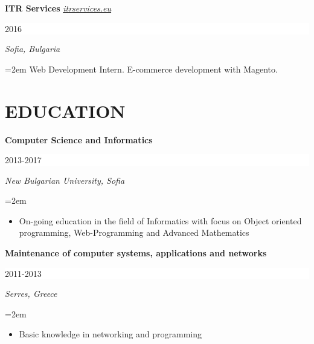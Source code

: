 \documentclass[paper=letter,fontsize=11pt]{scrartcl} %
\newcommand{\sepspace}{\vspace*{1em}}		%
\newcommand{\NewPart}[2]{\section*{\uppercase{#1} \small \normalfont #2}}
\newcommand{\EducationEntry}[4]{
		\noindent \textbf{#1} \hfill      %
		\colorbox{White}{%
			\parbox{6em}{%
			\hfill\color{Black}#2}} \par  %
		\noindent \textit{#3} \par        %
		\noindent\hangindent=2em\hangafter=0 \small #4 %
		\normalsize \par}
\newcommand{\WorkEntry}[5]{
		\noindent \textbf{#1}
        \noindent \small \textit{#2}
        \hfill      %
        \colorbox{White}{%
			\parbox{6em}{%
			\hfill\color{Black}#3}} \par  %
		\noindent \textit{#4} \par        %
		\noindent\hangindent=2em\hangafter=0 \small #5 %
		\normalsize \par}
\begin{document}
\WorkEntry{ITR Services}{\href{http://itrservices.eu/}{itrservices.eu}}{2016}{Sofia, Bulgaria}{Web Development Intern. E-commerce development with Magento.}

\sepspace

\NewPart{Education}{}


\EducationEntry{Computer Science and Informatics}
{2013-2017}
{New Bulgarian University, Sofia}
{\begin{itemize}
\item{On-going education in the field of Informatics with focus on Object oriented programming, Web-Programming and Advanced Mathematics}
\end{itemize}}

\sepspace

\EducationEntry{Maintenance of computer systems, applications and networks
}{2011-2013}{Serres, Greece}{
\begin{itemize}\item{Basic knowledge in networking and programming}\end{itemize}}
\end{document}
